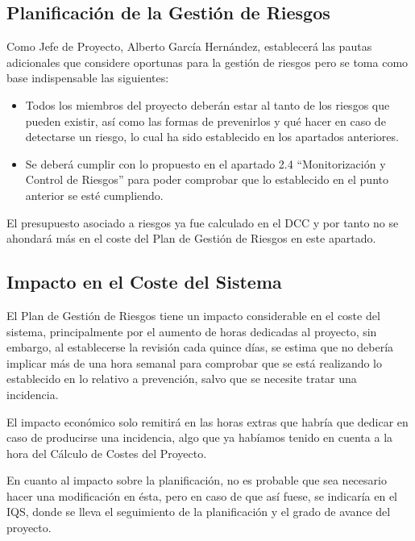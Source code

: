 \subsection{Planificación de la Gestión de Riesgos}
\par Como Jefe de Proyecto, Alberto García Hernández, establecerá las pautas adicionales que considere oportunas para la gestión de riesgos pero se toma como base indispensable las siguientes:
\begin{itemize}[-]
  \item Todos los miembros del proyecto deberán estar al tanto de los riesgos que pueden existir, así como las formas de prevenirlos y qué hacer en caso de detectarse un riesgo, lo cual ha sido establecido en los apartados anteriores.
  \item Se deberá cumplir con lo propuesto en el apartado 2.4 “Monitorización y Control de Riesgos” para poder comprobar que lo establecido en el punto anterior se esté cumpliendo.
\end{itemize}

\par El presupuesto asociado a riesgos ya fue calculado en el DCC y por tanto no se ahondará más en el coste del Plan de Gestión de Riesgos en este apartado.

\subsection{Impacto en el Coste del Sistema}
\par El Plan de Gestión de Riesgos tiene un impacto considerable en el coste del sistema, principalmente por el aumento de horas dedicadas al proyecto, sin embargo, al establecerse la revisión cada quince días, se estima que no debería implicar más de una hora semanal para comprobar que se está realizando lo establecido en lo relativo a prevención, salvo que se necesite tratar una incidencia.

El impacto económico solo remitirá en las horas extras que habría que dedicar en caso de producirse una incidencia, algo que ya habíamos tenido en cuenta a la hora del Cálculo de Costes del Proyecto.

En cuanto al impacto sobre la planificación, no es probable que sea necesario hacer una modificación en ésta, pero en caso de que así fuese, se indicaría en el IQS, donde se lleva el seguimiento de la planificación y el grado de avance del proyecto.
